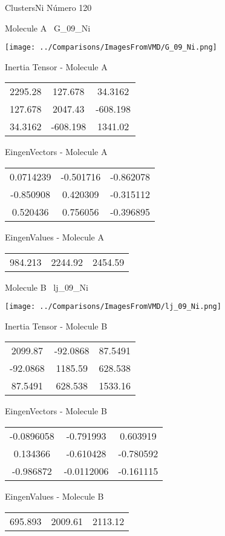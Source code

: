  \newpage

\vtab[-3cm]
\begin{center}
{\large ClustersNi \tab Número 120}
\end{center}
\begin{multicols}{2}
\begin{center}

Molecule A \
G\_09\_Ni

\texttt{[image: ../Comparisons/ImagesFromVMD/G\_09\_Ni.png]}

Inertia Tensor - Molecule A \\
\begin{tabular}{|c c c|}
2295.28	 & 	127.678	 & 	34.3162	 \\
127.678	 & 	2047.43	 & 	-608.198	 \\
34.3162	 & 	-608.198	 & 	1341.02
\end{tabular}

\vtab
 EingenVectors - Molecule A     \\
\begin{tabular}{|c c c|}
0.0714239	 & 	-0.501716	 & 	-0.862078	 \\
-0.850908	 & 	0.420309	 & 	-0.315112	 \\
0.520436	 & 	0.756056	 & 	-0.396895
\end{tabular}

\vtab
 EingenValues - Molecule A     \\
\begin{tabular}{|c c c|}
984.213	 & 	2244.92	 & 	2454.59	 \\
\end{tabular}
\columnbreak

Molecule B \
lj\_09\_Ni

\texttt{[image: ../Comparisons/ImagesFromVMD/lj\_09\_Ni.png]}

Inertia Tensor - Molecule B \\
\begin{tabular}{|c c c|}
2099.87	 & 	-92.0868	 & 	87.5491	 \\
-92.0868	 & 	1185.59	 & 	628.538	 \\
87.5491	 & 	628.538	 & 	1533.16
\end{tabular}

\vtab
 EingenVectors - Molecule B     \\
\begin{tabular}{|c c c|}
-0.0896058	 & 	-0.791993	 & 	0.603919	 \\
0.134366	 & 	-0.610428	 & 	-0.780592	 \\
-0.986872	 & 	-0.0112006	 & 	-0.161115
\end{tabular}

\vtab
 EingenValues - Molecule B     \\
\begin{tabular}{|c c c|}
695.893	 & 	2009.61	 & 	2113.12	 \\
\end{tabular}

\end{center}
\end{multicols}

